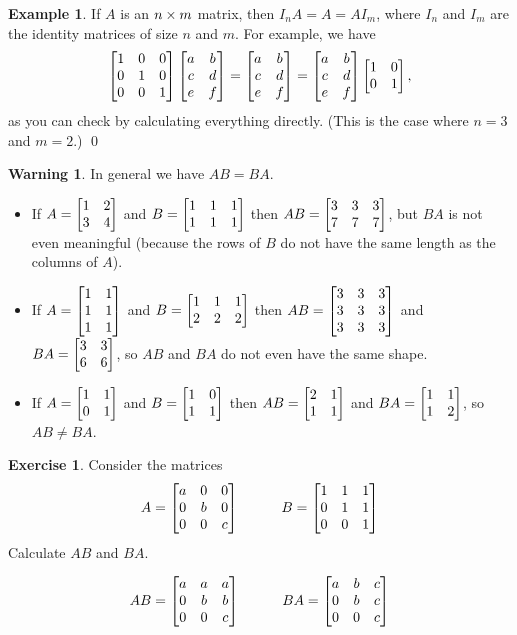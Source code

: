 \documentclass[a4paper]{book}
\theoremstyle{definition}
\newtheorem{warning}[theorem]{Warning}
\newtheorem{example}[theorem]{Example}
\newtheorem{exercise}[theorem]{Exercise}
\renewenvironment{solution}{\SolutionInline}{\endSolutionInline}
\begin{document}
\begin{example}
 If $A$ is an $n\times m$ matrix, then $I_nA=A=AI_m$, where $I_n$ and
 $I_m$ are the identity matrices of size $n$ and $m$.  For example, we
 have
 \[ \begin{bmatrix} 1&0&0\\0&1&0\\0&0&1\end{bmatrix}
    \begin{bmatrix} a&b \\ c&d \\ e&f\end{bmatrix} = 
    \begin{bmatrix} a&b \\ c&d \\ e&f\end{bmatrix} = 
    \begin{bmatrix} a&b \\ c&d \\ e&f\end{bmatrix} 
    \begin{bmatrix} 1&0 \\ 0&1 \end{bmatrix},
 \]
 as you can check by calculating everything directly.  (This is the
 case where $n=3$ and $m=2$.) \qed
\end{example}
\begin{warning}
 In general we  have $AB=BA$.  
 \begin{itemize}
 \item If $A=\begin{bmatrix} 1&2\\3&4\end{bmatrix}$ and $B=\begin{bmatrix} 1&1&1\\1&1&1\end{bmatrix}$ then
  $AB=\begin{bmatrix} 3&3&3\\7&7&7\end{bmatrix}$, but $BA$ is not even meaningful (because
  the rows of $B$ do not have the same length as the columns of $A$).
 \item If $A=\begin{bmatrix} 1&1\\1&1\\1&1\end{bmatrix}$ and $B=\begin{bmatrix} 1&1&1\\2&2&2\end{bmatrix}$
  then $AB=\begin{bmatrix} 3&3&3\\3&3&3\\3&3&3\end{bmatrix}$ and $BA=\begin{bmatrix} 3&3\\6&6\end{bmatrix}$,
  so $AB$ and $BA$ do not even have the same shape.
 \item If $A=\begin{bmatrix} 1&1\\0&1\end{bmatrix}$ and $B=\begin{bmatrix} 1&0\\1&1\end{bmatrix}$ then
  $AB=\begin{bmatrix} 2&1\\1&1\end{bmatrix}$ and $BA=\begin{bmatrix} 1&1\\1&2\end{bmatrix}$, so $AB\neq BA$.
 \end{itemize}
\end{warning}

\begin{exercise}
 Consider the matrices
 \[ A = \begin{bmatrix} a&0&0\\ 0&b&0\\ 0&0&c \end{bmatrix} \hspace{3em}
    B = \begin{bmatrix} 1&1&1\\ 0&1&1\\ 0&0&1 \end{bmatrix}
 \]
 Calculate $AB$ and $BA$.
\end{exercise}
\begin{solution}
 \[ AB = \begin{bmatrix} a&a&a\\ 0&b&b\\ 0&0&c \end{bmatrix}
    \hspace{3em}
    BA = \begin{bmatrix} a&b&c\\ 0&b&c\\ 0&0&c \end{bmatrix}
 \]
\end{solution}
\end{document}
